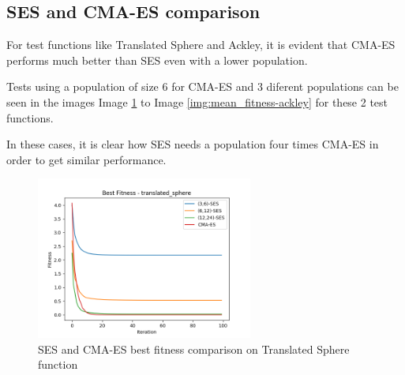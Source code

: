 



\subsection{SES and CMA-ES comparison}

For test functions like Translated Sphere and Ackley, it is evident that CMA-ES performs much better than SES even with a lower population.

Tests using a population of size 6 for CMA-ES and 3 diferent populations can be seen in the images Image \ref{img:best_fitness-translated_sphere} to Image \ref{img:mean_fitness-ackley} for these 2 test functions.

In these cases, it is clear how SES needs a population four times CMA-ES in order to get similar performance.

\begin{figure}
  \begin{center}
  \includegraphics[width=2.8in]{./../code/benchmark_results/best_fitness-translated_sphere.png}
  \caption{SES and CMA-ES best fitness comparison on Translated Sphere function}
  \label{img:best_fitness-translated_sphere}
  \end{center}
\end{figure}

